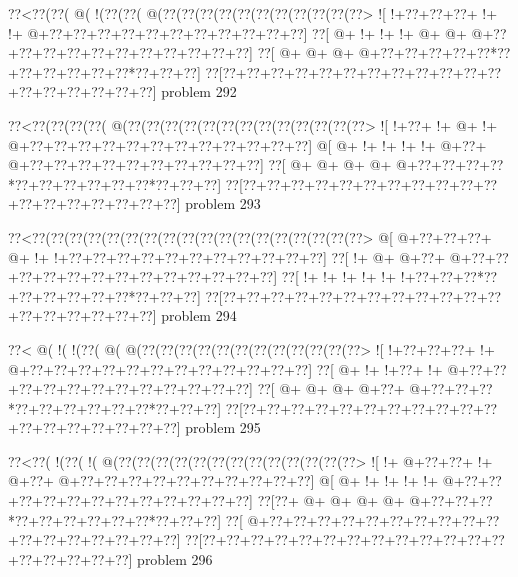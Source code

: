 \vbox{\vbox{\goo
\0??<\0??(\0??(\- @(\- !(\0??(\0??(\- @(\0??(\0??(\0??(\0??(\0??(\0??(\0??(\0??(\0??(\0??(\0??>
\- ![\- !+\0??+\0??+\0??+\- !+\- !+\- @+\0??+\0??+\0??+\0??+\0??+\0??+\0??+\0??+\0??+\0??+\0??]
\0??[\- @+\- !+\- !+\- !+\- @+\- @+\- @+\0??+\0??+\0??+\0??+\0??+\0??+\0??+\0??+\0??+\0??+\0??]
\0??[\- @+\- @+\- @+\- @+\0??+\0??+\0??+\0??+\0??*\0??+\0??+\0??+\0??+\0??+\0??*\0??+\0??+\0??]
\0??[\0??+\0??+\0??+\0??+\0??+\0??+\0??+\0??+\0??+\0??+\0??+\0??+\0??+\0??+\0??+\0??+\0??+\0??]
}
\hfil problem 292\hfil\break
}



\vbox{\vbox{\goo
\0??<\0??(\0??(\0??(\0??(\- @(\0??(\0??(\0??(\0??(\0??(\0??(\0??(\0??(\0??(\0??(\0??(\0??(\0??>
\- ![\- !+\0??+\- !+\- @+\- !+\- @+\0??+\0??+\0??+\0??+\0??+\0??+\0??+\0??+\0??+\0??+\0??+\0??]
\- @[\- @+\- !+\- !+\- !+\- !+\- @+\0??+\- @+\0??+\0??+\0??+\0??+\0??+\0??+\0??+\0??+\0??+\0??]
\0??[\- @+\- @+\- @+\- @+\- @+\0??+\0??+\0??+\0??*\0??+\0??+\0??+\0??+\0??+\0??*\0??+\0??+\0??]
\0??[\0??+\0??+\0??+\0??+\0??+\0??+\0??+\0??+\0??+\0??+\0??+\0??+\0??+\0??+\0??+\0??+\0??+\0??]
}
\hfil problem 293\hfil\break
}



\vbox{\vbox{\goo
\0??<\0??(\0??(\0??(\0??(\0??(\0??(\0??(\0??(\0??(\0??(\0??(\0??(\0??(\0??(\0??(\0??(\0??(\0??>
\- @[\- @+\0??+\0??+\0??+\- @+\- !+\- !+\0??+\0??+\0??+\0??+\0??+\0??+\0??+\0??+\0??+\0??+\0??]
\0??[\- !+\- @+\- @+\0??+\- @+\0??+\0??+\0??+\0??+\0??+\0??+\0??+\0??+\0??+\0??+\0??+\0??+\0??]
\0??[\- !+\- !+\- !+\- !+\- !+\- !+\0??+\0??+\0??*\0??+\0??+\0??+\0??+\0??+\0??*\0??+\0??+\0??]
\0??[\0??+\0??+\0??+\0??+\0??+\0??+\0??+\0??+\0??+\0??+\0??+\0??+\0??+\0??+\0??+\0??+\0??+\0??]
}
\hfil problem 294\hfil\break
}



\vbox{\vbox{\goo
\0??<\- @(\- !(\- !(\0??(\- @(\- @(\0??(\0??(\0??(\0??(\0??(\0??(\0??(\0??(\0??(\0??(\0??(\0??>
\- ![\- !+\0??+\0??+\0??+\- !+\- @+\0??+\0??+\0??+\0??+\0??+\0??+\0??+\0??+\0??+\0??+\0??+\0??]
\0??[\- @+\- !+\- !+\0??+\- !+\- @+\0??+\0??+\0??+\0??+\0??+\0??+\0??+\0??+\0??+\0??+\0??+\0??]
\0??[\- @+\- @+\- @+\- @+\0??+\- @+\0??+\0??+\0??*\0??+\0??+\0??+\0??+\0??+\0??*\0??+\0??+\0??]
\0??[\0??+\0??+\0??+\0??+\0??+\0??+\0??+\0??+\0??+\0??+\0??+\0??+\0??+\0??+\0??+\0??+\0??+\0??]
}
\hfil problem 295\hfil\break
}



\vbox{\vbox{\goo
\0??<\0??(\- !(\0??(\- !(\- @(\0??(\0??(\0??(\0??(\0??(\0??(\0??(\0??(\0??(\0??(\0??(\0??(\0??>
\- ![\- !+\- @+\0??+\0??+\- !+\- @+\0??+\- @+\0??+\0??+\0??+\0??+\0??+\0??+\0??+\0??+\0??+\0??]
\- @[\- @+\- !+\- !+\- !+\- !+\- @+\0??+\0??+\0??+\0??+\0??+\0??+\0??+\0??+\0??+\0??+\0??+\0??]
\0??[\0??+\- @+\- @+\- @+\- @+\- @+\0??+\0??+\0??*\0??+\0??+\0??+\0??+\0??+\0??*\0??+\0??+\0??]
\0??[\- @+\0??+\0??+\0??+\0??+\0??+\0??+\0??+\0??+\0??+\0??+\0??+\0??+\0??+\0??+\0??+\0??+\0??]
\0??[\0??+\0??+\0??+\0??+\0??+\0??+\0??+\0??+\0??+\0??+\0??+\0??+\0??+\0??+\0??+\0??+\0??+\0??]
}
\hfil problem 296\hfil\break
}



